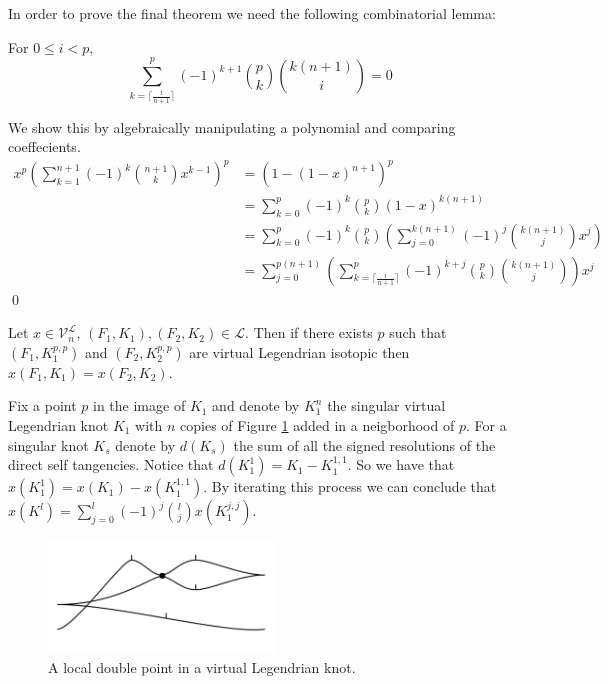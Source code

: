 In order to prove the final theorem we need the following combinatorial lemma:

\begin{lem} \label{comboLem}
For $0\leq i < p$,
$$\sum_{k=\lceil\frac{i}{n+1}\rceil}^p (-1)^{k+1}\binom{p}{k}\binom{k(n+1)}{i} = 0$$
\end{lem}
\pp
We show this by algebraically manipulating a polynomial and comparing coeffecients.
\begin{align*}
x^p\left(\sum_{k=1}^{n+1}(-1)^k\binom{n+1}{k}x^{k-1}\right)^p &= (1-(1-x)^{n+1})^p\\
 &= \sum_{k=0}^p (-1)^k\binom{p}{k}(1-x)^{k(n+1)}\\
 &= \sum_{k=0}^p (-1)^k\binom{p}{k}\left( \sum_{j=0}^{k(n+1)}(-1)^j\binom{k(n+1)}{j}x^j \right)\\
 &= \sum_{j=0}^{p(n+1)} \left( \sum_{k=\lceil\frac{i}{n+1}\rceil}^p (-1)^{k+j}\binom{p}{k}\binom{k(n+1)}{j} \right) x^j
\end{align*}
\qed

\begin{thm}
Let $x\in \mathcal{V}_n^\mathcal{L}$, $(F_1, K_1), (F_2, K_2) \in \mathcal{L}$.  Then if there exists $p$ such that  $(F_1, K_1^{p,p})$ and $(F_2, K_2^{p,p})$ are virtual Legendrian isotopic then $x(F_1, K_1) = x(F_2, K_2)$.
\end{thm}

Fix a point $p$ in the image of $K_1$ and denote by $K_1^n$ the singular virtual Legendrian knot $K_1$ with $n$ copies of Figure \ref{DoublePoint.fig} added in a neigborhood of $p$.  For a singular knot $K_s$ denote by $d(K_s)$ the sum of all the signed resolutions of the direct self tangencies.  Notice that $d(K_1^1) = K_1 - K_1^{1,1}$.  So we have that $x( K_1^1) = x(K_1) - x(K_1^{1,1})$.  By iterating this process we can conclude that $x(K^l) = \sum_{j=0}^{l}(-1)^j\binom{l}{j}x\left(K_1^{j,j}\right)$.

\begin{figure}[htbp]
	\includegraphics[width=6cm]{DoublePoint}
	\caption{A local double point in a virtual Legendrian knot.}
	\label{DoublePoint.fig}
\end{figure}

